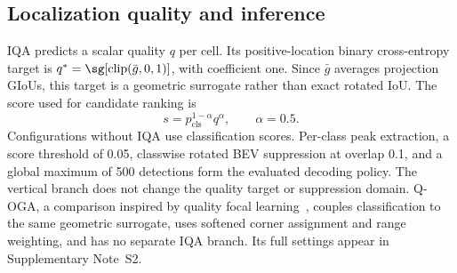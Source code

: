 \subsection{Localization quality and inference}
\label{sec:quality}
IQA predicts a scalar quality $q$ per cell. Its positive-location binary cross-entropy target is $q^*=\sg[\operatorname{clip}(\bar g,0,1)]$, with coefficient one. Since $\bar g$ averages projection GIoUs, this target is a geometric surrogate rather than exact rotated IoU. The score used for candidate ranking is
\begin{equation}
 s=p_{\mathrm{cls}}^{1-\alpha}q^\alpha,\qquad \alpha=0.5.
\end{equation}
Configurations without IQA use classification scores. Per-class peak extraction, a score threshold of 0.05, classwise rotated BEV suppression at overlap 0.1, and a global maximum of 500 detections form the evaluated decoding policy. The vertical branch does not change the quality target or suppression domain. Q-OGA, a comparison inspired by quality focal learning~\cite{li2020gfl}, couples classification to the same geometric surrogate, uses softened corner assignment and range weighting, and has no separate IQA branch. Its full settings appear in Supplementary Note~S2.
